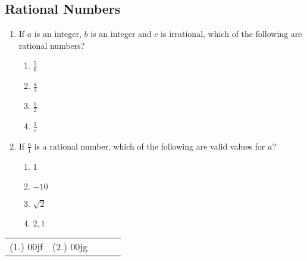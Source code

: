 \label{m38348*secfhsst!!!underscore!!!id232}
            \subsection{ Rational Numbers }
            \nopagebreak
            \label{m38348*id63121}\begin{enumerate}[noitemsep, label=\textbf{\arabic*}. ] 
            \label{m38348*uid9}\item If $a$ is an integer, $b$ is an integer and $c$ is irrational, which of the following are rational numbers? 
\label{m38348*id734}\begin{enumerate}[noitemsep, label=\textbf{\alph*}. ] 
            \item $\frac{5}{6}$\newline
    \item $\frac{a}{3}$\newline
    \item $\frac{b}{2}$\newline
    \item $\frac{1}{c}$\end{enumerate}
        \label{m38348*uid10}\item If $\frac{a}{1}$ is a rational number, which of the following are valid values for $a$?\label{m38348*id7432}\begin{enumerate}[noitemsep, label=\textbf{\alph*}. ] 
            \item 1\item $-10$\item $\sqrt{2}$\item $2,1$\end{enumerate}
        \end{enumerate}
\practiceinfo
\par 
 \par \begin{tabular}[h]{ccccc}
 (1.) 00jf&  (2.) 00jg& \end{tabular}
